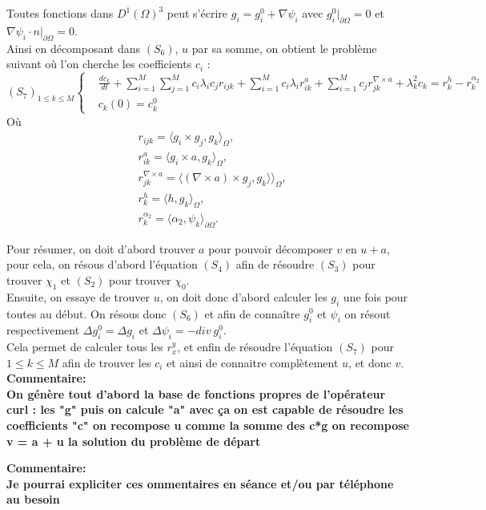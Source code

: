 \documentclass[a4paper,11pt]{article} %
\begin{document}
Toutes fonctions dans $D^1(\Omega)^3$ peut s'écrire $g_i=g_i^0+\nabla\psi_i$ avec $g_i^0\big\rvert_{\partial\Omega} = 0$ et $ \nabla\psi_i\cdot n\big\rvert_{\partial\Omega} = 0$.\\
Ainsi en décomposant dans $(S_6)$, $u$ par sa somme, on obtient le problème suivant où l'on cherche les coefficients $c_i$ :
\[
(S_7)_{1\leq k\leq M}\left\{
\begin{aligned}
&\frac{dc_k}{dt}+\sum_{i=1}^M\sum_{j=1}^M c_i\lambda_i c_j r_{ijk} + \sum_{i=1}^M c_i \lambda_i r_{ik}^a + \sum_{i=1}^M c_j r_{jk}^{\nabla\times a} + \lambda_k^2 c_k = r_k^h - r_k^{\alpha_2}\\
&c_k(0)=c_k^0
\end{aligned}
\right.
\]
Où
\[
\begin{aligned}
&r_{ijk} = \langle g_i\times g_j, g_k\rangle_\Omega,\\
&r_{ik}^a=\langle g_i\times a, g_k\rangle_\Omega,\\
&r_{jk}^{\nabla\times a}=\langle (\nabla\times a)\times g_j, g_k\rangle\rangle_\Omega,\\
&r_k^h=\langle h,g_k\rangle_\Omega,\\
&r_k^{\alpha_2} = \langle \alpha_2,\psi_k\rangle_{\partial\Omega}.
\end{aligned}
\]

Pour résumer, on doit d'abord trouver $a$ pour pouvoir décomposer $v$ en $u+a$, pour cela, on résous d'abord l'équation $(S_4)$ afin de résoudre $(S_3)$ pour trouver $\chi_1$ et $(S_2)$ pour trouver $\chi_0$.\\
Ensuite, on essaye de trouver $u$, on doit donc d'abord calculer les $g_i$ une fois pour toutes au début. On résous donc $(S_6)$ et afin de connaître $g_i^0$ et $\psi_i$ on résout respectivement $\Delta g_i^0=\Delta g_i$ et $ \Delta\psi_i= -div\ g_i^0$.\\
Cela permet de calculer tous les $r_x^y$, et enfin de résoudre l'équation $(S_7)$ pour $1\leq k\leq M$ afin de trouver les $c_i$ et ainsi de connaitre complètement $u$, et donc $v$.\\


\textbf{Commentaire:\\
On génère tout d'abord la base de fonctions propres de l'opérateur curl : les "g"
puis on calcule "a"
avec ça on est capable de résoudre les coefficients "c"
on recompose u comme la somme des c*g
on recompose v = a + u la solution du problème de départ}

\hspace{10mm}

\textbf{Commentaire:\\
Je pourrai expliciter ces ommentaires en séance et/ou par téléphone au besoin}
\end{document}
